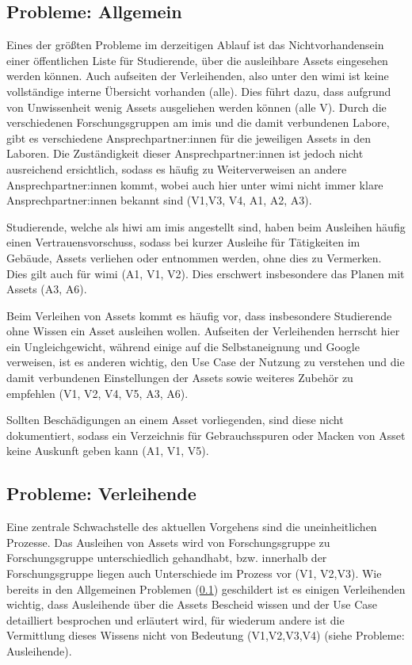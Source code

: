\subsection{Probleme: Allgemein}
\label{section:probleme-allgemein}
Eines der größten Probleme im derzeitigen Ablauf ist das Nichtvorhandensein einer öffentlichen
Liste für Studierende, über die ausleihbare Assets eingesehen werden können. Auch aufseiten der
Verleihenden, also unter den \ac{wimi} ist keine vollständige interne Übersicht vorhanden (alle).
Dies führt dazu, dass aufgrund von Unwissenheit wenig Assets ausgeliehen werden können (alle V). Durch
die verschiedenen Forschungsgruppen am \ac{imis} und die damit verbundenen Labore, gibt es
verschiedene Ansprechpartner:innen für die jeweiligen Assets in den Laboren. Die Zuständigkeit
dieser Ansprechpartner:innen ist jedoch nicht ausreichend ersichtlich, sodass es häufig zu
Weiterverweisen an andere Ansprechpartner:innen kommt, wobei auch hier unter \ac{wimi} nicht immer
klare Ansprechpartner:innen bekannt sind (V1,V3, V4, A1, A2, A3).

Studierende, welche als \ac{hiwi} am \ac{imis} angestellt sind, haben beim Ausleihen häufig einen
Vertrauensvorschuss, sodass bei kurzer Ausleihe für Tätigkeiten im Gebäude, Assets verliehen oder
entnommen werden, ohne dies zu Vermerken. Dies gilt auch für \ac{wimi} (A1, V1, V2). Dies erschwert
insbesondere das Planen mit Assets (A3, A6).

Beim Verleihen von Assets kommt es häufig vor, dass insbesondere Studierende ohne Wissen ein Asset
ausleihen wollen. Aufseiten der Verleihenden herrscht hier ein Ungleichgewicht, während einige auf
die Selbstaneignung und Google verweisen, ist es anderen wichtig, den Use Case der Nutzung zu
verstehen und die damit verbundenen Einstellungen der Assets sowie weiteres Zubehör zu empfehlen
(V1, V2, V4, V5, A3, A6).

Sollten Beschädigungen an einem Asset vorliegenden, sind diese nicht dokumentiert, sodass ein
Verzeichnis für Gebrauchsspuren oder Macken von Asset keine Auskunft geben kann (A1, V1, V5).

\subsection{Probleme: Verleihende}
\label{section:probleme-verleihende}
Eine zentrale Schwachstelle des aktuellen Vorgehens sind die uneinheitlichen Prozesse. Das Ausleihen
von Assets wird von Forschungsgruppe zu Forschungsgruppe unterschiedlich gehandhabt, bzw. innerhalb
der Forschungsgruppe liegen auch Unterschiede im Prozess vor (V1, V2,V3). Wie bereits in den
Allgemeinen Problemen (\ref{section:probleme-allgemein}) geschildert ist es einigen Verleihenden
wichtig, dass Ausleihende über die Assets Bescheid wissen und der Use Case detailliert besprochen
und erläutert wird, für wiederum andere ist die Vermittlung dieses Wissens nicht von Bedeutung
(V1,V2,V3,V4) (siehe Probleme: Ausleihende).

